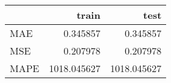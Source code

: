 \begin{tabular}{lrr}
\toprule
{} &        train &         test \\
\midrule
MAE  &     0.345857 &     0.345857 \\
MSE  &     0.207978 &     0.207978 \\
MAPE &  1018.045627 &  1018.045627 \\
\bottomrule
\end{tabular}
